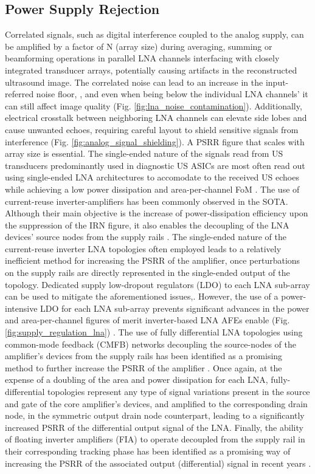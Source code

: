 \subsection{Power Supply Rejection}
\label{subsec:power_supply_rejection_ratio}

Correlated signals, such as digital interference coupled to the analog supply, can be amplified by a factor of N (array size) during averaging, summing or beamforming operations in parallel LNA channels interfacing with closely integrated transducer arrays, potentially causing artifacts in the reconstructed ultrasound image. The correlated noise can lead to an increase in the input-referred noise floor, \cite{Chen2015, Tan2018, Hopf2022},  and even when being below the individual LNA channels' it can still affect image quality (Fig. \ref{fig:lna_noise_contamination}).  Additionally, electrical crosstalk between neighboring LNA channels can elevate side lobes and cause unwanted echoes, requiring careful layout to shield sensitive signals from interference (Fig. \ref{fig:analog_signal_shielding}). A PSRR figure that scales with array size is essential. The single-ended nature of the signals read from US transducers predominantly used in diagnostic US ASICs are most often read out using single-ended LNA architectures to accomodate to the received US echoes while achieving a low power dissipation and area-per-channel FoM \cite{}. The use of current-reuse inverter-amplifiers has been commonly observed in the SOTA. Although their main objective is the increase of power-dissipation efficiency upon the suppression of the IRN figure, it also enables the decoupling of the LNA devices' source nodes from the supply rails \cite{}. The single-ended nature of the current-reuse inverter LNA topologies often employed leads to a relatively inefficient method for increasing the PSRR of the amplifier, once perturbations on the supply rails are directly represented in the single-ended output of the topology.
Dedicated supply low-dropout regulators (LDO) to each LNA sub-array can be used to mitigate the aforementioned issues,. However, the use of a power-intensive LDO for each LNA sub-array prevents significant advances in the power and area-per-channel figures of merit inverter-based LNA AFEs enable (Fig. \ref{fig:supply_regulation_lna}) \cite{Chen2016, Chen2017, Chen2018, Guo2022}. The use of fully differential LNA topologies using common-mode feedback (CMFB) networks decoupling the source-nodes of the amplifier's devices from the supply rails has been identified as a promising method to further increase the PSRR of the amplifier \cite{}. Once again, at the expense of a doubling of the area and power dissipation for each LNA, fully-differential topologies represent any type of signal variations present in the source and gate of the core amplifier's devices, and amplified to the corresponding drain node, in the symmetric output drain node counterpart, leading to a significantly increased PSRR of the differential output signal of the LNA\cite{}.  Finally, the ability of floating inverter amplifiers (FIA) to operate decoupled from the supply rail in their corresponding tracking phase has been identified as a promising way of increasing the PSRR of the associated output (differential) signal in recent years \cite{}. 
